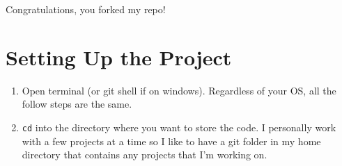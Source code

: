 \documentclass[11pt,fleqn]{article}
\theoremstyle{definition}
\begin{document}
Congratulations, you forked my repo!

\section*{Setting Up the Project}
\begin{enumerate}
\item
Open terminal (or git shell if on windows). Regardless of your OS, all the follow steps are the
same. 

\item
\texttt{cd} into the directory where you want to store the code. I personally work with a few
projects at a time so I like to have a git folder in my home directory that contains any projects
that I'm working on. 


\end{enumerate}
\end{document}
